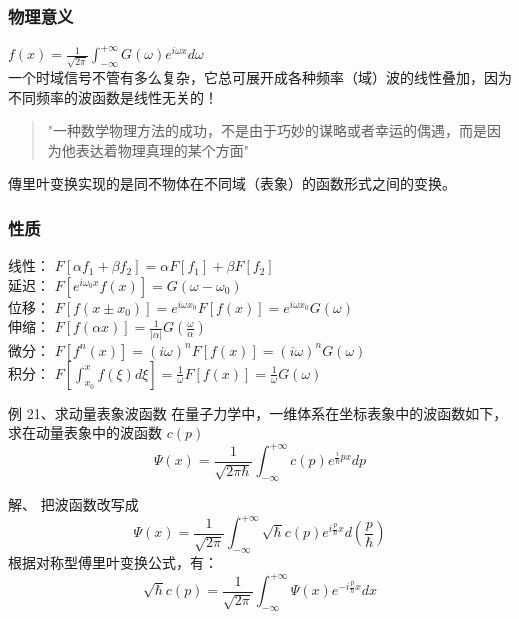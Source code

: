 \begin{frame}
	\frametitle{物理意义}
	{\Large   $\displaystyle f(x) =\frac{1}{\sqrt{2\pi}}  \int_{-\infty}^{+\infty}  G(\omega) e^{i\omega x} d\omega $ }\\	\vspace{0.3cm}
	一个时域信号不管有多么复杂，它总可展开成各种频率（域）波的线性叠加，因为不同频率的波函数是线性无关的！	\\ \vspace{0.3cm}
	\begin{quote} \noindent
	"一种数学物理方法的成功，不是由于巧妙的谋略或者幸运的偶遇，而是因为他表达着物理真理的某个方面"
	~~\\
	\end{quote}
	傳里叶变换实现的是同不物体在不同域（表象）的函数形式之间的变换。
\end{frame}

\begin{frame}
	\frametitle{性质 }
    线性： $F[\alpha  f_1 +\beta f_2]=\alpha  F[f_1]+ \beta F[f_2]$ \\ \vspace{0.3cm}
    延迟： $F[e^{i\omega_0x} f(x)] = G(\omega-\omega_0) $ \\ \vspace{0.3cm}
    位移： $F[ f(x\pm x_0)] = e^{i\omega x_0 } F[f(x)]=e^{i\omega x_0 }G(\omega) $ \\ \vspace{0.3cm}
    伸缩： $F[ f(\alpha  x)] = \frac{1}{|\alpha |}G(\frac{\omega}{\alpha }) $ \\ \vspace{0.3cm}
    微分： $F[ f^{n} (x)] = (i\omega ) ^n F[f(x)]= (i\omega )^n G(\omega) $ \\ \vspace{0.3cm}
    积分： $F[ \int_{x_0}^{x}f (\xi) d\xi ] = \frac{1}{\omega}  F[f(x)]=\frac{1}{\omega} G(\omega) $ \\ \vspace{0.3cm}
\end{frame}

\begin{frame}
	\begin{exampleblock} {例 21、求动量表象波函数}
	{在量子力学中，一维体系在坐标表象中的波函数如下，求在动量表象中的波函数 $c(p)$}
		\begin{equation*}
			\Psi(x)=\frac{1}{\sqrt{2\pi \hbar}}  \int_{-\infty}^{+\infty} c(p) e^{\frac{i}{\hbar} px} dp 
		\end{equation*}   	
	\end{exampleblock}
	\alert{解、} 把波函数改写成  \\	
	\begin{equation*}
		\Psi(x)= \frac{1}{\sqrt{2\pi }} \int_{-\infty}^{+\infty} \sqrt{\hbar} c(p) e^{i\frac{p}{\hbar} x} d(\frac{p}{\hbar})  
	\end{equation*}     
	根据对称型傅里叶变换公式，有： 
	\begin{equation*}
		\sqrt{\hbar} c(p) = \frac{1}{\sqrt{2\pi }} \int_{-\infty}^{+\infty} \Psi(x) e^{-i\frac{p}{\hbar} x} dx
	\end{equation*}   
\end{frame}

